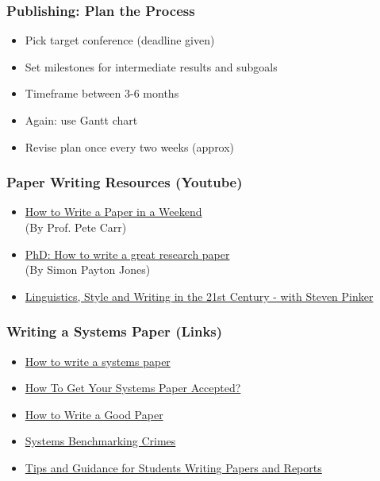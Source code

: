 \documentclass[hyperref={pdfpagelabels=false,linkcolor=blue}, aspectratio=1610]{beamer}
\begin{document}
\begin{frame}
\frametitle{Publishing: Plan the Process}
\begin{block}{}
 \begin{itemize}
  \item Pick target conference (deadline given)
  \item Set milestones for intermediate results and subgoals
  \item Timeframe between 3-6 months
  \item Again: use Gantt chart
  \item Revise plan once every two weeks (approx)
 \end{itemize}
\end{block}
\end{frame}

\begin{frame}
\frametitle{Paper Writing Resources (Youtube)}
\begin{block}{}
 \begin{itemize}
  \item \href{https://www.youtube.com/watch?v=UY7sVKJPTMA&feature=share}{How to Write a Paper in a Weekend}\\(By Prof. Pete Carr)
  \item \href{https://youtu.be/1AYxMbYZQ1Y}{PhD: How to write a great research paper}\\(By Simon Payton Jones)
  \item \href{https://youtu.be/OV5J6BfToSw}{Linguistics, Style and Writing in the 21st Century - with Steven Pinker}
 \end{itemize}
\end{block}
\end{frame}

\begin{frame}
\frametitle{Writing a Systems Paper (Links)}
\begin{block}{}
 \begin{itemize}
  \item \href{http://gramoli.redbellyblockchain.io/web/doc/talks/researchmethod.pdf}{How to write a systems paper}
  \item  \href{https://www.doc.ic.ac.uk/~prp/doc/talks/11-prp-paper_writing.pdf}{How To Get Your Systems Paper Accepted?}
  \item \href{http://www.cse.unsw.edu.au/~gernot/talk-howto-paper.pdf}{How to Write a Good Paper}
  \item  \href{http://www.cse.unsw.edu.au/~gernot/benchmarking-crimes.html}{Systems Benchmarking Crimes}
  \item \href{http://www.cse.unsw.edu.au/~gernot/style-guide.html}{Tips and Guidance for Students Writing Papers and Reports}
 \end{itemize}
\end{block}
\end{frame}
\end{document}
